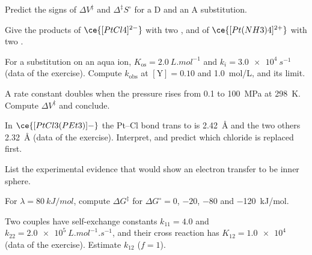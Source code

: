 \begin{exercise}[$\star$]\label{exo:b3:complex-mechanisms:3}
Predict the signs of $\Delta V^{\ddagger}$ and $\Delta^{\ddagger}S^\circ$ for a D and an A substitution.
\end{exercise}

\begin{exercise}[$\star$]\label{exo:b3:complex-mechanisms:4}
Give the products of $\ce{[PtCl4]^{2-}}$ with two , and of $\ce{[Pt(NH3)4]^{2+}}$ with two .
\end{exercise}

\begin{exercise}[$\star\star$]\label{exo:b3:complex-mechanisms:5}
For a substitution on an aqua ion, $K_{\mathrm{os}} = \qty{2.0}{L.mol^{-1}}$ and $k_i = \qty{3.0e4}{s^{-1}}$ (data of
the exercise). Compute $k_{\mathrm{obs}}$ at $[\mathrm Y] = 0.10$ and \qty{1.0}{mol/L}, and its limit.
\end{exercise}

\begin{exercise}[$\star\star$]\label{exo:b3:complex-mechanisms:6}
A rate constant doubles when the pressure rises from 0.1 to \qty{100}{MPa} at \qty{298}{K}.
Compute $\Delta V^{\ddagger}$ and conclude.
\end{exercise}

\begin{exercise}[$\star\star$]\label{exo:b3:complex-mechanisms:7}
In $\ce{[PtCl3(PEt3)]-}$ the Pt--Cl bond trans to  is \qty{2.42}{\angstrom} and the two others \qty{2.32}{\angstrom}
(data of the exercise). Interpret, and predict which chloride is replaced first.
\end{exercise}

\begin{exercise}[$\star\star$]\label{exo:b3:complex-mechanisms:8}
List the experimental evidence that would show an electron transfer to be inner
sphere.
\end{exercise}

\begin{exercise}[$\star\star$]\label{exo:b3:complex-mechanisms:9}
For $\lambda = \qty{80}{kJ/mol}$, compute $\Delta G^{\ddagger}$ for $\Delta G^\circ = 0$, $-20$, $-80$ and \qty{-120}{kJ/mol}.
\end{exercise}

\begin{exercise}[$\star\star\star$]\label{exo:b3:complex-mechanisms:10}
Two couples have self-exchange constants $k_{11} = 4.0$ and $k_{22} = \qty{2.0e5}{L.mol^{-1}.s^{-1}}$, and
their cross reaction has $K_{12} = \num{1.0e4}$ (data of the exercise). Estimate $k_{12}$ ($f = 1$).
\end{exercise}

